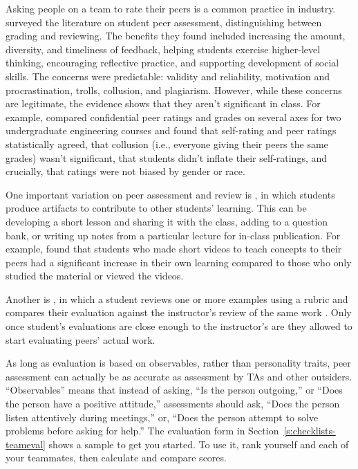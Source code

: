 Asking people on a team to rate their peers is a common practice in
industry. \cite{Sond2012} surveyed the literature on student peer
assessment, distinguishing between grading and reviewing. The benefits
they found included increasing the amount, diversity, and timeliness of
feedback, helping students exercise higher-level thinking, encouraging
reflective practice, and supporting development of social skills. The
concerns were predictable: validity and reliability, motivation and
procrastination, trolls, collusion, and plagiarism. However, while these
concerns are legitimate, the evidence shows that they aren't significant
in class. For example, \cite{Kauf2000} compared confidential peer
ratings and grades on several axes for two undergraduate engineering
courses and found that self-rating and peer ratings statistically
agreed, that collusion (i.e., everyone giving their peers the same
grades) wasn't significant, that students didn't inflate their
self-ratings, and crucially, that ratings were not biased by gender or
race.

One important variation on peer assessment and review is , in which students produce
artifacts to contribute to other students' learning. This can be
developing a short lesson and sharing it with the class, adding to a
question bank, or writing up notes from a particular lecture for
in-class publication. For example, \cite{Fran2018} found that
students who made short videos to teach concepts to their peers had a
significant increase in their own learning compared to those who only
studied the material or viewed the videos.

Another is , in
which a student reviews one or more examples using a rubric and
compares their evaluation against the instructor's review of the same
work \cite{Kulk2013}. Only once student's evaluations are close
enough to the instructor's are they allowed to start evaluating peers'
actual work.

As long as evaluation is based on observables, rather than personality
traits, peer assessment can actually be as accurate as assessment by TAs
and other outsiders. ``Observables'' means that instead of asking, ``Is the
person outgoing,'' or ``Does the person have a positive attitude,''
assessments should ask, ``Does the person listen attentively during
meetings,'' or, ``Does the person attempt to solve problems before asking
for help.'' The evaluation form in Section~\ref{s:checklists-teameval} shows a
sample to get you started. To use it, rank yourself and each of your
teammates, then calculate and compare scores.

